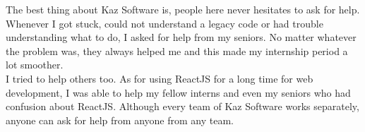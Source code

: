 The best thing about Kaz Software is, people here never hesitates to ask for help.
Whenever I got stuck, could not understand a legacy code or had trouble understanding what to do, I asked for help from my seniors.
No matter whatever the problem was, they always helped me and this made my internship period a lot smoother.\\

I tried to help others too.
As for using ReactJS for a long time for web development, I was able to help my fellow interns and even my seniors who had confusion about ReactJS.
Although every team of Kaz Software works separately, anyone can ask for help from anyone from any team.


